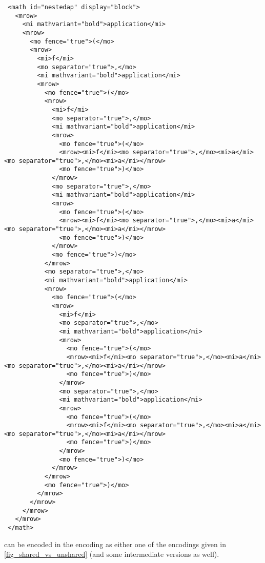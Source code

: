 \begin{description}
\begin{lstlisting}
 <math id="nestedap" display="block">
   <mrow>
     <mi mathvariant="bold">application</mi>
     <mrow>
       <mo fence="true">(</mo>
       <mrow>
         <mi>f</mi>
         <mo separator="true">,</mo>
         <mi mathvariant="bold">application</mi>
         <mrow>
           <mo fence="true">(</mo>
           <mrow>
             <mi>f</mi>
             <mo separator="true">,</mo>
             <mi mathvariant="bold">application</mi>
             <mrow>
               <mo fence="true">(</mo>
               <mrow><mi>f</mi><mo separator="true">,</mo><mi>a</mi><mo separator="true">,</mo><mi>a</mi></mrow>
               <mo fence="true">)</mo>
             </mrow>
             <mo separator="true">,</mo>
             <mi mathvariant="bold">application</mi>
             <mrow>
               <mo fence="true">(</mo>
               <mrow><mi>f</mi><mo separator="true">,</mo><mi>a</mi><mo separator="true">,</mo><mi>a</mi></mrow>
               <mo fence="true">)</mo>
             </mrow>
             <mo fence="true">)</mo>
           </mrow>
           <mo separator="true">,</mo>
           <mi mathvariant="bold">application</mi>
           <mrow>
             <mo fence="true">(</mo>
             <mrow>
               <mi>f</mi>
               <mo separator="true">,</mo>
               <mi mathvariant="bold">application</mi>
               <mrow>
                 <mo fence="true">(</mo>
                 <mrow><mi>f</mi><mo separator="true">,</mo><mi>a</mi><mo separator="true">,</mo><mi>a</mi></mrow>
                 <mo fence="true">)</mo>
               </mrow>
               <mo separator="true">,</mo>
               <mi mathvariant="bold">application</mi>
               <mrow>
                 <mo fence="true">(</mo>
                 <mrow><mi>f</mi><mo separator="true">,</mo><mi>a</mi><mo separator="true">,</mo><mi>a</mi></mrow>
                 <mo fence="true">)</mo>
               </mrow>
               <mo fence="true">)</mo>
             </mrow>
           </mrow>
           <mo fence="true">)</mo>
         </mrow>
       </mrow>
     </mrow>
   </mrow>
 </math>
\end{lstlisting}
can be encoded in the \XML encoding as either one of the \XML encodings given in
\ref{fig_shared_vs_unshared} (and some intermediate versions as well).
\end{description}

